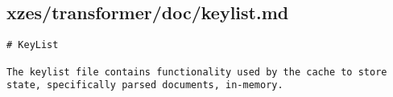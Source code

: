 \subsection{xzes/transformer/doc/keylist.md}
\begin{lstlisting}[caption={Documentation about the keylist library used for in the caching.}]
# KeyList

The keylist file contains functionality used by the cache to store state, specifically parsed documents, in-memory.
\end{lstlisting}
